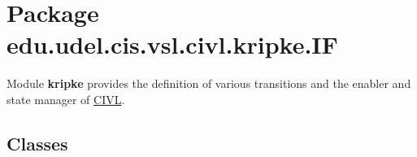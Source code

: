 \hypertarget{namespaceedu_1_1udel_1_1cis_1_1vsl_1_1civl_1_1kripke_1_1IF}{}\section{Package edu.\+udel.\+cis.\+vsl.\+civl.\+kripke.\+I\+F}
\label{namespaceedu_1_1udel_1_1cis_1_1vsl_1_1civl_1_1kripke_1_1IF}


Module {\bfseries kripke} provides the definition of various transitions and the enabler and state manager of \hyperlink{classedu_1_1udel_1_1cis_1_1vsl_1_1civl_1_1CIVL}{C\+I\+V\+L}.  


\subsection*{Classes}
